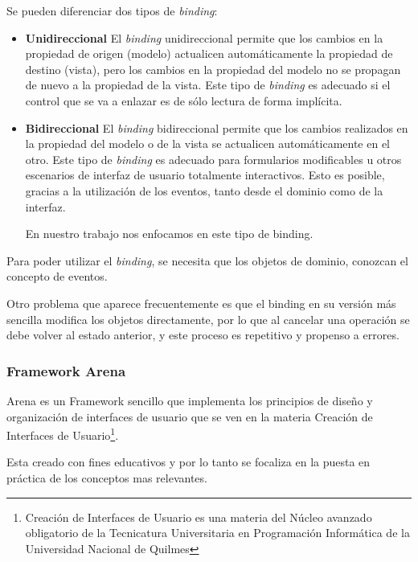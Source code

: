 	\bigskip
	
	Se pueden diferenciar dos tipos de \emph{binding}:
	
	\begin {itemize}
	
		\item {\bf Unidireccional}
		El \emph{binding} unidireccional permite que los cambios en la propiedad de
		origen (modelo) actualicen automáticamente la propiedad de destino (vista),
		pero los cambios en la propiedad del modelo no se propagan de nuevo a la
		propiedad de la vista.
		Este tipo de \emph{binding} es adecuado si el control que se va a enlazar es
		de sólo lectura de forma implícita.		
		
		\item {\bf Bidireccional}
		El \emph{binding} bidireccional permite que los cambios realizados en la
		propiedad del modelo o de la vista se actualicen automáticamente en el
		otro. Este tipo de \emph{binding} es adecuado para formularios modificables u
		otros escenarios de interfaz de usuario totalmente interactivos.
		Esto es posible, gracias a la utilización de los eventos, tanto desde el
		dominio como de la interfaz.
	
		En nuestro trabajo nos enfocamos en este tipo de binding.
		 
	
	\end {itemize}
	


	Para poder utilizar el \emph{binding}, se necesita que los objetos de dominio, 
	conozcan el concepto de eventos.
	
	Otro problema que aparece frecuentemente es que el binding en su versión más 
	sencilla modifica los objetos directamente, por lo que al cancelar una operación 
	se debe volver al estado anterior, y este proceso es repetitivo y propenso a errores. 

	
\subsubsection{Framework Arena}
	Arena es un Framework sencillo que implementa los principios de diseño y
	organización de interfaces de usuario que se ven en la materia Creación de
	Interfaces de Usuario\footnote{Creación de Interfaces de Usuario
	es una materia del Núcleo avanzado obligatorio de la Tecnicatura
	Universitaria en Programación Informática de la Universidad Nacional de
	Quilmes}.
	
	Esta creado con fines educativos y por lo tanto se focaliza en la puesta en
	práctica de los conceptos mas relevantes.